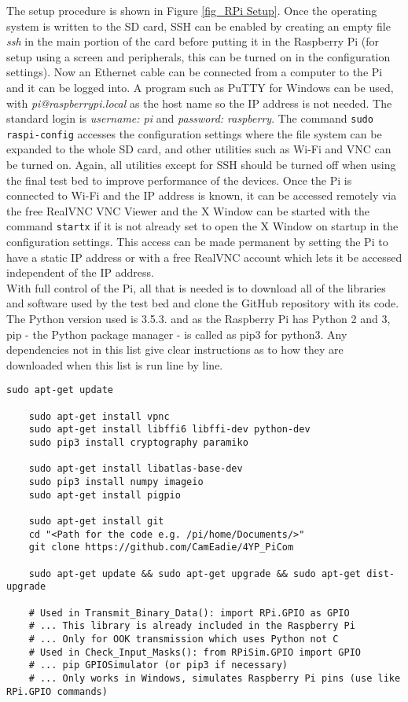 \documentclass[../main.tex]{subfiles}
\begin{document}
The setup procedure is shown in Figure \ref{fig_RPi Setup}.
Once the operating system is written to the SD card, SSH can be enabled by creating an empty file \textit{ssh} in the main portion of the card before putting it in the Raspberry Pi (for setup using a screen and peripherals, this can be turned on in the configuration settings).
Now an Ethernet cable can be connected from a computer to the Pi and it can be logged into.
A program such as PuTTY \cite{lib_PuTTY} for Windows can be used, with \textit{pi@raspberrypi.local} as the host name so the IP address is not needed.
The standard login is \textit{username: pi} and \textit{password: raspberry}.
The command \colorbox{backcolour}{\lstinline{sudo raspi-config}} accesses the configuration settings where the file system can be expanded to the whole SD card, and other utilities such as Wi-Fi and VNC can be turned on.
Again, all utilities except for SSH should be turned off when using the final test bed to improve performance of the devices.
Once the Pi is connected to Wi-Fi and the IP address is known, it can be accessed remotely via the free RealVNC VNC Viewer \cite{lib_RealVNCViewer} and the X Window can be started with the command \colorbox{backcolour}{\lstinline{startx}} if it is not already set to open the X Window on startup in the configuration settings.
This access can be made permanent by setting the Pi to have a static IP address or with a free RealVNC account which lets it be accessed independent of the IP address.\\

With full control of the Pi, all that is needed is to download all of the libraries and software used by the test bed and clone the GitHub repository with its code.
The Python version used is 3.5.3.
and as the Raspberry Pi has Python 2 and 3, pip - the Python package manager - is called as pip3 for python3.
Any dependencies not in this list give clear instructions as to how they are downloaded when this list is run line by line.\\

\begin{lstlisting}[caption=Libraries and Packages Required for the Test Bed]
	sudo apt-get update
	
	sudo apt-get install vpnc
	sudo apt-get install libffi6 libffi-dev python-dev
	sudo pip3 install cryptography paramiko
	
	sudo apt-get install libatlas-base-dev
	sudo pip3 install numpy imageio
	sudo apt-get install pigpio
	
	sudo apt-get install git
	cd "<Path for the code e.g. /pi/home/Documents/>"
	git clone https://github.com/CamEadie/4YP_PiCom

	sudo apt-get update && sudo apt-get upgrade && sudo apt-get dist-upgrade

	# Used in Transmit_Binary_Data(): import RPi.GPIO as GPIO
	# ... This library is already included in the Raspberry Pi
	# ... Only for OOK transmission which uses Python not C
	# Used in Check_Input_Masks(): from RPiSim.GPIO import GPIO
	# ... pip GPIOSimulator (or pip3 if necessary)
	# ... Only works in Windows, simulates Raspberry Pi pins (use like RPi.GPIO commands)
\end{lstlisting}
\end{document}
